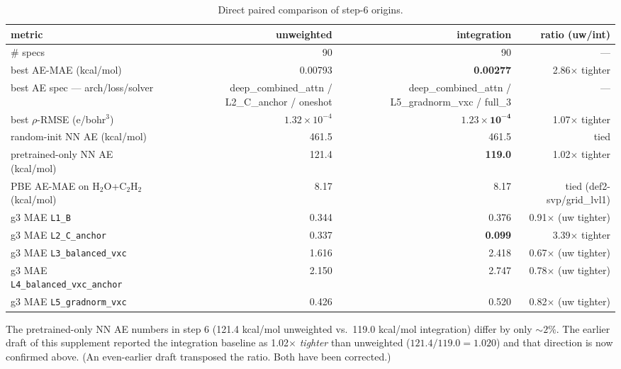 \documentclass[11pt,letterpaper]{article}
\begin{document}
\begin{table}[h]
\centering
\caption{Direct paired comparison of step-6 origins.}
\small
\begin{tabular}{lrrr}
\toprule
metric & unweighted & integration & ratio (uw/int) \\
\midrule
\# specs                              & 90          & 90           & --- \\
best AE-MAE (kcal/mol)                & 0.00793     & \textbf{0.00277} & 2.86$\times$ tighter \\
best AE spec --- arch/loss/solver     & deep\_combined\_attn / L2\_C\_anchor / oneshot & deep\_combined\_attn / L5\_gradnorm\_vxc / full\_3 & --- \\
best $\rho$-RMSE (e/bohr$^3$)         & $1.32\!\times\!10^{-4}$ & $\mathbf{1.23\!\times\!10^{-4}}$ & 1.07$\times$ tighter \\
random-init NN AE (kcal/mol)          & 461.5       & 461.5        & tied \\
pretrained-only NN AE (kcal/mol)      & 121.4       & \textbf{119.0} & 1.02$\times$ tighter \\
PBE AE-MAE on H$_2$O+C$_2$H$_2$ (kcal/mol) & 8.17        & 8.17         & tied (def2-svp/grid\_lvl1) \\
\midrule
g3 MAE \texttt{L1\_B}                 & 0.344       & 0.376        & 0.91$\times$ (uw tighter) \\
g3 MAE \texttt{L2\_C\_anchor}         & 0.337       & \textbf{0.099} & 3.39$\times$ tighter \\
g3 MAE \texttt{L3\_balanced\_vxc}     & 1.616       & 2.418        & 0.67$\times$ (uw tighter) \\
g3 MAE \texttt{L4\_balanced\_vxc\_anchor} & 2.150   & 2.747        & 0.78$\times$ (uw tighter) \\
g3 MAE \texttt{L5\_gradnorm\_vxc}     & 0.426       & 0.520        & 0.82$\times$ (uw tighter) \\
\bottomrule
\end{tabular}
\end{table}

\noindent
The pretrained-only NN AE numbers in step 6 (121.4 kcal/mol unweighted vs.\
119.0 kcal/mol integration) differ by only $\sim 2\%$. The earlier draft of
this supplement reported the integration baseline as 1.02$\times$ \emph{tighter}
than unweighted ($121.4 / 119.0 = 1.020$) and that direction is now confirmed
above. (An even-earlier draft transposed the ratio. Both have been corrected.)
\end{document}
